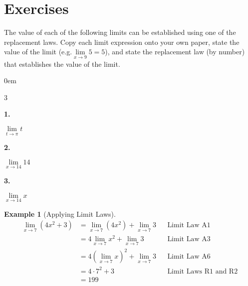\documentclass[12pt,]{book}
\theoremstyle{plain}
\theoremstyle{definition}
\newtheorem{example}[theorem]{Example}
\numberwithin{equation}{section}
\newenvironment{exercisegroup}%
{\medskip\noindent}%
{\par\bigskip}%
\newlength{\exercisegroupindent}%
\newlength{\exercisegroupitemwidth}%
\newenvironment{exercisegrouplist}%
{\vspace{-\partopsep}%
\begin{adjustwidth}{\exercisegroupindent}{0em}}%
{\end{adjustwidth}%
\vspace{-\partopsep}%
\vspace{\baselineskip}}%
\newenvironment{exercisegroupbycol}[1]%
{\begin{exercisegrouplist}%
\vspace{-\multicolsep}%
\begin{multicols}{#1}%
\setlength{\parindent}{0em}%
\setlength{\exercisegroupitemwidth}{\linewidth}}%
{\end{multicols}%
\vspace{-\multicolsep}%
\end{exercisegrouplist}}%
\newenvironment{exercisegroupitem}[1]%
{\begin{minipage}[t]{\exercisegroupitemwidth}
\vspace{0pt}%
{\bfseries#1}%
\rule{0pt}{\baselineskip}}{\strut%
\end{minipage}%
\hspace{\columnsep}}%
\providecommand\phantomsection{}
\begin{document}
\section*{Exercises}\label{exercises-5}

\begin{exercisegroup}%
The value of each of the following limits can be established using one of the replacement laws. Copy each limit expression onto your own paper, state the value of the limit (e.g.\@ \(\lim\limits_{x\to9}5=5\)), and state the replacement law (by number) that establishes the value of the limit.%
\begin{exercisegroupbycol}{3}%
\begin{exercisegroupitem}{1. }\phantomsection\hypertarget{exercise-50}{\null}
\(\lim\limits_{t\to\pi}t\)%
\end{exercisegroupitem}%
\par%
\begin{exercisegroupitem}{2. }\phantomsection\hypertarget{exercise-51}{\null}
\(\lim\limits_{x\to14}14\)%
\end{exercisegroupitem}%
\par%
\begin{exercisegroupitem}{3. }\phantomsection\hypertarget{exercise-52}{\null}
\(\lim\limits_{x\to14}x\)%
\end{exercisegroupitem}%
\par%
\end{exercisegroupbycol}%
\end{exercisegroup}%
\begin{example}[Applying Limit Laws]\label{example-apply-limit-laws}
\begin{align*}
\lim_{x\to7}\left(4x^2+3\right)&=\lim_{x\to7}\left(4x^2\right)+\lim_{x\to7}3&&\text{Limit Law A1}\\
&=4\lim_{x\to7}x^2+\lim_{x\to7}3&&\text{Limit Law A3}\\
&=4\left(\lim_{x\to7}x\right)^2+\lim_{x\to7}3&&\text{Limit Law A6}\\
&=4\cdot7^2+3&&\text{Limit Laws R1 and R2}\\
&=199
\end{align*}%
\end{example}
\end{document}
